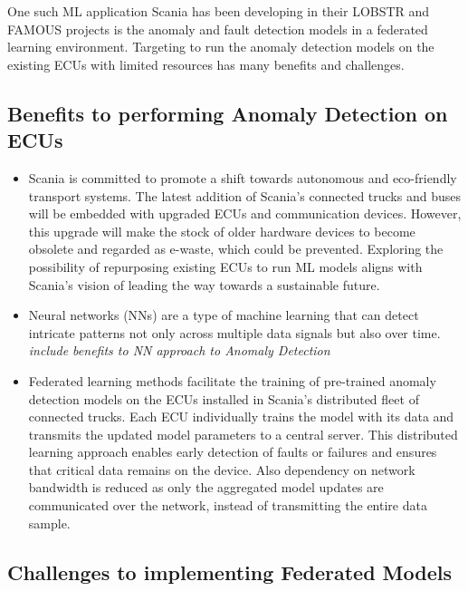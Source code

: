 One such ML application Scania has been developing in their \textsc{LOBSTR} \cite{lobstr} and \textsc{FAMOUS} \cite{famous} projects is the anomaly and fault detection models in a federated learning environment. Targeting to run the anomaly detection models on the existing ECUs with limited resources has many benefits and challenges.

\subsection*{Benefits to performing Anomaly Detection on ECUs}

\begin{itemize}
	\item Scania is committed to promote a shift towards autonomous and eco-friendly transport systems. The latest addition of Scania's connected trucks and buses will be embedded with upgraded ECUs and communication devices. However, this upgrade will make the stock of older hardware devices to become obsolete and regarded as e-waste, which could be prevented. Exploring the possibility of repurposing existing ECUs to run ML models aligns with Scania's vision of leading the way towards a sustainable future.
	\item Neural networks (NNs) are a type of machine learning that can detect intricate patterns not only across multiple data signals but also over time. \textit{include benefits to NN approach to Anomaly Detection}
	\item Federated learning methods facilitate the training of pre-trained anomaly detection models on the ECUs installed in Scania's distributed fleet of connected trucks. Each ECU individually trains the model with its data and transmits the updated model parameters to a central server. This distributed learning approach enables early detection of faults or failures and ensures that critical data remains on the device. Also dependency on network bandwidth is reduced as only the aggregated model updates are communicated over the network, instead of transmitting the entire data sample.
\end{itemize}

\subsection*{Challenges to implementing Federated Models}

